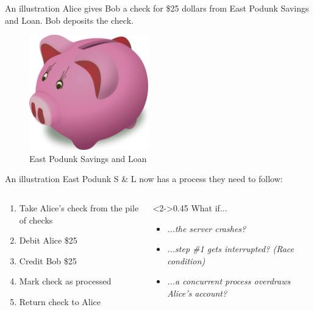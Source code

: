 \documentclass[svgnames]{beamer}
\begin{document}
\begin{frame}{An illustration}
    Alice gives Bob a check for \$25 dollars from East Podunk Savings and
    Loan. Bob deposits the check.
    \begin{figure}
        \includegraphics[height=5cm]{bank}
        \\ East Podunk Savings and Loan
    \end{figure}
\end{frame}

\begin{frame}{An illustration}
    East Podunk S \& L now has a process they need to follow:
    \begin{columns}[t]
        \begin{column}{0.45\textwidth}
            \begin{enumerate}
                \item Take Alice's check from the pile of checks
                \item Debit Alice \$25
                \item Credit Bob \$25
                \item Mark check as processed
                \item Return check to Alice
            \end{enumerate}
        \end{column}
        \begin{column}<2->{0.45\textwidth}
            \color[rgb]{1,0,0}What if...
            \begin{itemize}
                \item     \color[rgb]{1,0,0} \textit{...the server crashes?}
                \item<3-> \color[rgb]{1,0,0} \textit{...step \#1 gets interrupted? (Race condition)}
                \item<4-> \color[rgb]{1,0,0} \textit{...a concurrent process overdraws Alice's account?}
            \end{itemize}
        \end{column}
    \end{columns}
\end{frame}
\end{document}
